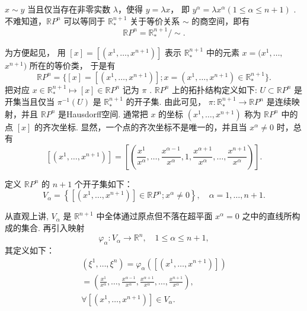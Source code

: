 $x \sim y$  当且仅当存在非零实数  $\lambda$，使得  $y = \lambda x$， 即  $y^{\alpha} = \lambda x^{\alpha} (1 \leqslant \alpha \leqslant n + 1)$ . 不难知道，$\mathbb{R}P^{n}$  可以等同于  $\mathbb{R}_{*}^{n + 1}$  关于等价关系  $\sim$  的商空间，即有
$$
\mathbb {R} P ^ {n} = \mathbb {R} _ {*} ^ {n + 1} / \sim .
$$

为方便起见， 用  $[x] = [(x^{1},\dots ,x^{n + 1})]$  表示  $\mathbb{R}_*^{n + 1}$  中的元素  $x = (x^{1},\dots ,$ $x^{n + 1})$  所在的等价类， 于是有
$$
\mathbb {R} P ^ {n} = \{[ x ] = [ (x ^ {1}, \dots , x ^ {n + 1}) ]; x = (x ^ {1}, \dots , x ^ {n + 1}) \in \mathbb {R} _ {*} ^ {n + 1} \}.
$$
把对应  $x \in \mathbb{R}_*^{n+1} \mapsto [x] \in \mathbb{R}P^n$  记为  $\pi$ .  $\mathbb{R}P^n$  上的拓扑结构定义如下:  $U \subset \mathbb{R}P^n$  是开集当且仅当  $\pi^{-1}(U)$  是  $\mathbb{R}_*^{n+1}$  的开子集. 由此可见，  $\pi: \mathbb{R}_*^{n+1} \to \mathbb{R}P^n$  是连续映射，并且  $\mathbb{R}P^n$  是Hausdorff空间. 通常把  $x$  的坐标  $(x^1, \dots, x^{n+1})$  称为  $\mathbb{R}P^n$  中的点  $[x]$  的齐次坐标. 显然，一个点的齐次坐标不是唯一的，并且当  $x^\alpha \neq 0$  时，总有
$$
[ (x ^ {1}, \dots , x ^ {n + 1}) ] = \left[ \left(\frac {x ^ {1}}{x ^ {\alpha}}, \dots , \frac {x ^ {\alpha - 1}}{x ^ {\alpha}}, 1, \frac {x ^ {\alpha + 1}}{x ^ {\alpha}}, \dots , \frac {x ^ {n + 1}}{x ^ {\alpha}}\right) \right].
$$

定义  $\mathbb{R}P^n$  的  $n + 1$  个开子集如下：
$$
V _ {\alpha} = \left\{\left[ \left(x ^ {1}, \dots , x ^ {n + 1}\right) \right] \in \mathbb {R} P ^ {n}; x ^ {\alpha} \neq 0 \right\}, \quad \alpha = 1, \dots , n + 1.
$$

从直观上讲,  $V_{\alpha}$  是  $\mathbb{R}^{n + 1}$  中全体通过原点但不落在超平面  $x^{\alpha} = 0$  之中的直线所构成的集合. 再引入映射
$$
\varphi_ {\alpha}: V _ {\alpha} \rightarrow \mathbb {R} ^ {n}, \quad 1 \leqslant \alpha \leqslant n + 1,
$$
其定义如下：
$$
\begin{array}{l} (\xi^ {1}, \dots , \xi^ {n}) = \varphi_ {\alpha} ([ (x ^ {1}, \dots , x ^ {n + 1}) ]) \\ = \left(\frac {x ^ {1}}{x ^ {\alpha}}, \dots , \frac {x ^ {\alpha - 1}}{x ^ {\alpha}}, \frac {x ^ {\alpha + 1}}{x ^ {\alpha}}, \dots , \frac {x ^ {n + 1}}{x ^ {\alpha}}\right), \\ \forall [ (x ^ {1}, \dots , x ^ {n + 1}) ] \in V _ {\alpha}. \\ \end{array}
$$

